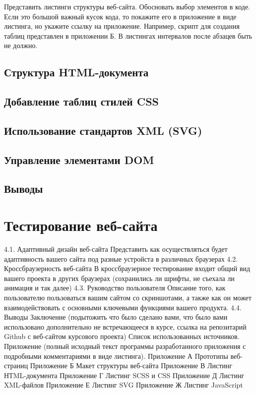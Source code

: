 \documentclass{article}
\begin{document}
    Представить листинги структуры веб-сайта. Обосновать выбор элементов в коде. 
    Если это большой важный кусок кода, то покажите его в приложение в виде листинга, но укажите ссылку на приложение. Например, скрипт для создания таблиц представлен в приложении Б. В листингах интервалов после абзацев быть не должно.
    \subsection{Структура HTML-документа}
    \subsection{Добавление таблиц стилей CSS}
    \subsection{Использование стандартов XML (SVG)}
    \subsection{Управление элементами DOM}
    \subsection{Выводы}





    \section{Тестирование веб-сайта}

    4.1. Адаптивный дизайн веб-сайта
    Представить как осуществляться будет адаптивность вашего сайта под разные устройста в различных браузерах
    4.2. Кроссбраузерность веб-сайта
    В кроссбраузерное тестирование входит общий вид вашего проекта в других браузерах (сохранились ли шрифты, не съехала ли анимация и так далее)
    4.3. Руководство пользователя
    Описание того, как пользователю пользоваться вашим сайтом со скриншотами, а также как он может взаимодействовать с основными ключевыми функциями вашего продукта.
    4.4. Выводы
    Заключение (подытожить что было сделано вами, что было вами использовано дополнительно не встречающееся в курсе, ссылка на репозитарий Github с веб-сайтом курсового проекта)
    Список использованных источников.
    Приложение (полный исходный текст программы разработанного приложения с подробными комментариями в виде листинга).
    Приложение А Прототипы веб-страниц
    Приложение Б Макет структуры веб-сайта
    Приложение В Листинг НТML-документа
    Приложение Г Листинг SCSS и CSS
    Приложение Д Листинг XML-файлов
    Приложение Е Листинг SVG
    Приложение Ж Листинг JavaScript

    
\end{document}
